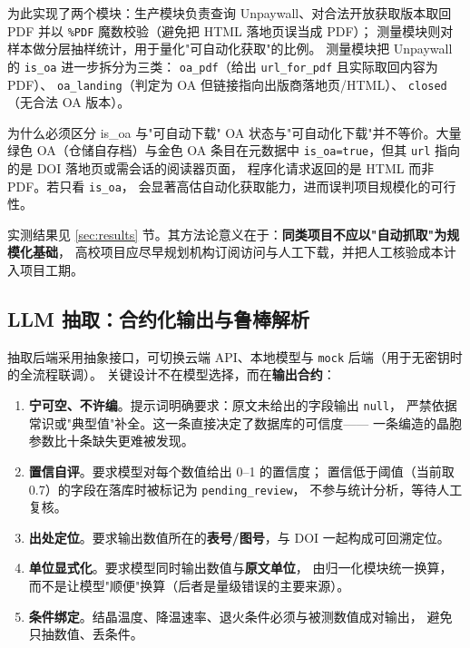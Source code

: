 \documentclass[11pt,a4paper]{ctexart}
\begin{document}
为此实现了两个模块：生产模块负责查询 Unpaywall、对合法开放获取版本取回 PDF
并以 \texttt{\%PDF} 魔数校验（避免把 HTML 落地页误当成 PDF）；
测量模块则对样本做分层抽样统计，用于量化"可自动化获取"的比例。
测量模块把 Unpaywall 的 \texttt{is\_oa} 进一步拆分为三类：
\texttt{oa\_pdf}（给出 \texttt{url\_for\_pdf} 且实际取回内容为 PDF）、
\texttt{oa\_landing}（判定为 OA 但链接指向出版商落地页/HTML）、
\texttt{closed}（无合法 OA 版本）。

\begin{tipbox}{为什么必须区分 is\_oa 与"可自动下载"}
OA 状态与"可自动化下载"并不等价。大量绿色 OA（仓储自存档）与金色 OA 条目在元数据中
\texttt{is\_oa=true}，但其 \texttt{url} 指向的是 DOI 落地页或需会话的阅读器页面，
程序化请求返回的是 HTML 而非 PDF。若只看 \texttt{is\_oa}，
会显著高估自动化获取能力，进而误判项目规模化的可行性。
\end{tipbox}

实测结果见 \ref{sec:results} 节。其方法论意义在于：\textbf{同类项目不应以"自动抓取"为规模化基础}，
高校项目应尽早规划机构订阅访问与人工下载，并把人工核验成本计入项目工期。

\subsection{LLM 抽取：合约化输出与鲁棒解析}

抽取后端采用抽象接口，可切换云端 API、本地模型与 \texttt{mock} 后端（用于无密钥时的全流程联调）。
关键设计不在模型选择，而在\textbf{输出合约}：

\begin{enumerate}[label=(\arabic*), leftmargin=2.2em]
  \item \textbf{宁可空、不许编}。提示词明确要求：原文未给出的字段输出 \texttt{null}，
        严禁依据常识或"典型值"补全。这一条直接决定了数据库的可信度——
        一条编造的晶胞参数比十条缺失更难被发现。
  \item \textbf{置信自评}。要求模型对每个数值给出 0--1 的置信度；
        置信低于阈值（当前取 0.7）的字段在落库时被标记为 \texttt{pending\_review}，
        不参与统计分析，等待人工复核。
  \item \textbf{出处定位}。要求输出数值所在的\textbf{表号/图号}，与 DOI 一起构成可回溯定位。
  \item \textbf{单位显式化}。要求模型同时输出数值与\textbf{原文单位}，
        由归一化模块统一换算，而不是让模型"顺便"换算（后者是量级错误的主要来源）。
  \item \textbf{条件绑定}。结晶温度、降温速率、退火条件必须与被测数值成对输出，
        避免只抽数值、丢条件。
\end{enumerate}
\end{document}
